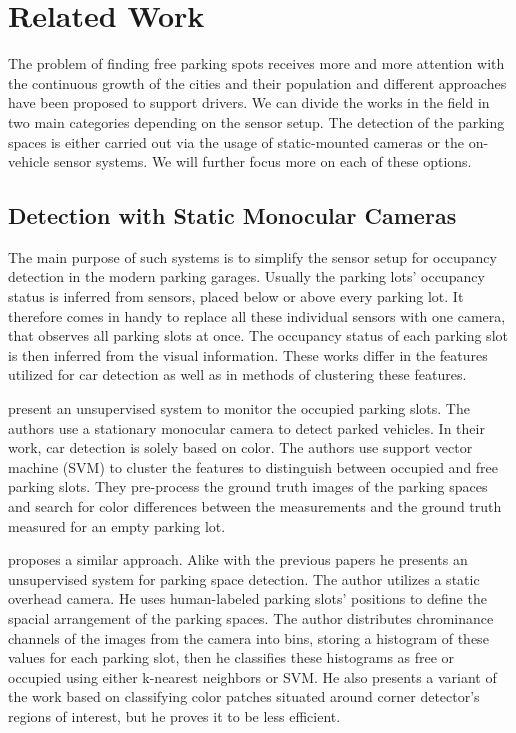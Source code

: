 \chapter{Related Work}
\label{cha:related_works}

The problem of finding free parking spots receives more and more attention
with the continuous growth of the cities and their population and different
approaches have been proposed to support drivers. We can divide the works in
the field in two main categories depending on the sensor setup. The detection
of the parking spaces is either carried out via the usage of static-mounted
cameras or the on-vehicle sensor systems. We will further focus more on each
of these options.

\section*{Detection with Static Monocular Cameras} %
\label{sec:detection_with_monocular_cameras}

The main purpose of such systems is to simplify the sensor setup for occupancy
detection in the modern parking garages. Usually the parking lots' occupancy
status is inferred from sensors, placed below or above every parking lot. It
therefore comes in handy to replace all these individual sensors with one
camera, that observes all parking slots at once. The occupancy status of each
parking slot is then inferred from the visual information. These works differ
in the features utilized for car detection as well as in methods of clustering
these features.

\citet{qizhang06} present an unsupervised system to monitor the occupied
parking slots. The authors use a stationary monocular camera to detect parked
vehicles. In their work, car detection is solely based on color. The authors
use support vector machine (SVM) to cluster the features to distinguish
between occupied and free parking slots. They pre-process the ground truth
images of the parking spaces and search for color differences between the
measurements and the ground truth measured for an empty parking lot.

\citet{nicolastrue} proposes a similar approach. Alike with the previous
papers he presents an unsupervised system for parking space detection. The
author utilizes a static overhead camera. He uses human-labeled parking slots'
positions to define the spacial arrangement of the parking spaces. The author
distributes chrominance channels of the images from the camera into bins,
storing a histogram of these values for each parking slot, then he classifies
these histograms as free or occupied using either k-nearest neighbors or
SVM\@. He also presents a variant of the work based on classifying color
patches situated around corner detector's regions of interest, but he proves
it to be less efficient.

